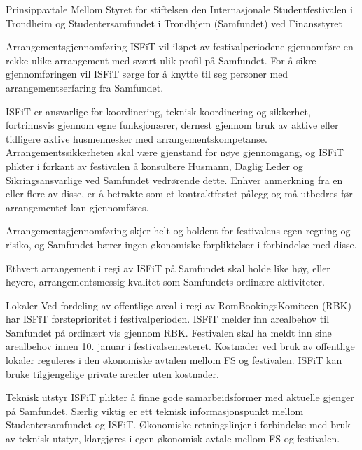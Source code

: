 \begin{instruks*}{Prinsippavtale Mellom Styret for stiftelsen den Internasjonale Studentfestivalen i
        Trondheim og Studentersamfundet i Trondhjem (Samfundet) ved Finansstyret}
    \begin{instruksledd}{Arrangementsgjennomføring}
        ISFiT vil iløpet av festivalperiodene gjennomføre en rekke ulike arrangement med
        svært ulik profil på Samfundet. For å sikre gjennomføringen vil ISFiT sørge for å knytte til seg
        personer med arrangementserfaring fra Samfundet. 

        ISFiT er ansvarlige for koordinering, teknisk koordinering og sikkerhet, fortrinnsvis gjennom egne
        funksjonærer, dernest gjennom bruk av aktive eller tidligere aktive husmennesker med
        arrangementskompetanse.
        Arrangementssikkerheten skal være gjenstand for nøye gjennomgang, og ISFiT plikter i forkant av
        festivalen å
        konsultere Husmann, Daglig Leder og Sikringsansvarlige ved Samfundet vedrørende dette. Enhver
        anmerkning fra en
        eller flere av disse, er å betrakte som et kontraktfestet pålegg og må utbedres før arrangementet
        kan gjennomføres.

        Arrangementsgjennomføring skjer helt og holdent for festivalens egen regning og risiko, og Samfundet
        bærer ingen økonomiske forpliktelser i forbindelse med disse.

        Ethvert arrangement i regi av ISFiT på Samfundet skal holde like høy, eller høyere,
        arrangementsmessig kvalitet som Samfundets ordinære aktiviteter.
    \end{instruksledd}

    \begin{instruksledd}{Lokaler}
        Ved fordeling av offentlige areal i regi av RomBookingsKomiteen (RBK) har ISFiT førsteprioritet i
        festivalperioden.
        ISFiT melder inn arealbehov til Samfundet på ordinært vis gjennom RBK. Festivalen skal ha meldt inn
        sine arealbehov innen 10. januar i festivalsemesteret. Kostnader ved bruk av offentlige lokaler
        reguleres i den økonomiske
        avtalen mellom FS og festivalen. ISFiT kan bruke tilgjengelige private arealer uten kostnader.
    \end{instruksledd}

    \begin{instruksledd}{Teknisk utstyr}
        ISFiT plikter å finne gode samarbeidsformer med aktuelle gjenger på Samfundet. Særlig viktig er ett
        teknisk
        informasjonspunkt mellom Studentersamfundet og ISFiT. Økonomiske retningslinjer i forbindelse med
        bruk av
        teknisk utstyr, klargjøres i egen økonomisk avtale mellom FS og festivalen.
    \end{instruksledd}


\end{instruks*}
